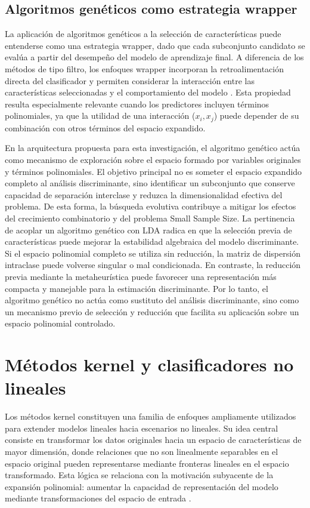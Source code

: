 \subsection{Algoritmos genéticos como estrategia wrapper}

La aplicación de algoritmos genéticos a la selección de características puede entenderse como una estrategia wrapper, dado que cada subconjunto candidato se evalúa a partir del desempeño del modelo de aprendizaje final. A diferencia de los métodos de tipo filtro, los enfoques wrapper incorporan la retroalimentación directa del clasificador y permiten considerar la interacción entre las características seleccionadas y el comportamiento del modelo \cite{kohavi1997wrappers} \cite{guyon2003introduction}. Esta propiedad resulta especialmente relevante cuando los predictores incluyen términos polinomiales, ya que la utilidad de una interacción ($x_i,x_j$) puede depender de su combinación con otros términos del espacio expandido.

En la arquitectura propuesta para esta investigación, el algoritmo genético actúa como mecanismo de exploración sobre el espacio formado por variables originales y términos polinomiales. El objetivo principal no es someter el espacio expandido completo al análisis discriminante, sino identificar un subconjunto que conserve capacidad de separación interclase y reduzca la dimensionalidad efectiva del problema. De esta forma, la búsqueda evolutiva contribuye a mitigar los efectos del crecimiento combinatorio y del problema Small Sample Size.
La pertinencia de acoplar un algoritmo genético con LDA radica en que la selección previa de características puede mejorar la estabilidad algebraica del modelo discriminante. Si el espacio polinomial completo se utiliza sin reducción, la matriz de dispersión intraclase puede volverse singular o mal condicionada. En contraste, la reducción previa mediante la metaheurística puede favorecer una representación más compacta y manejable para la estimación discriminante. Por lo tanto, el algoritmo genético no actúa como sustituto del análisis discriminante, sino como un mecanismo previo de selección y reducción que facilita su aplicación sobre un espacio polinomial controlado.

\section{Métodos kernel y clasificadores no lineales}

Los métodos kernel constituyen una familia de enfoques ampliamente utilizados para
extender modelos lineales hacia escenarios no lineales. Su idea central consiste en
transformar los datos originales hacia un espacio de características de mayor dimensión, donde relaciones que no son linealmente separables en el espacio original pueden representarse mediante fronteras lineales en el espacio transformado. Esta lógica se relaciona con la motivación subyacente de la expansión polinomial: aumentar la capacidad de representación del modelo mediante transformaciones del espacio de entrada \cite{scholkopf2018learning}.

